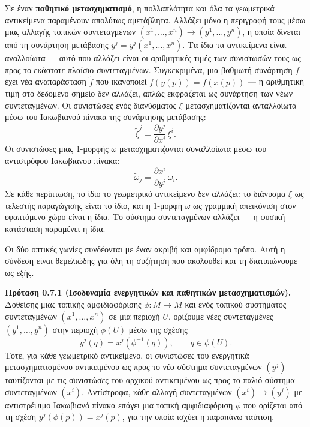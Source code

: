 \documentclass[12pt]{article}
\begin{document}
Σε έναν \textbf{παθητικό μετασχηματισμό}, η πολλαπλότητα και όλα τα γεωμετρικά αντικείμενα παραμένουν απολύτως αμετάβλητα. Αλλάζει μόνο η περιγραφή τους μέσω μιας αλλαγής τοπικών συντεταγμένων $(x^1, \dots, x^n) \to (y^1, \dots, y^n)$, η οποία δίνεται από τη συνάρτηση μετάβασης $y^j = y^j(x^1, \dots, x^n)$. Τα ίδια τα αντικείμενα είναι αναλλοίωτα — αυτό που αλλάζει είναι οι αριθμητικές τιμές των συνιστωσών τους ως προς το εκάστοτε πλαίσιο συντεταγμένων. Συγκεκριμένα, μια βαθμωτή συνάρτηση $f$ έχει νέα αναπαράσταση $\tilde{f}$ που ικανοποιεί $\tilde{f}(y(p)) = f(x(p))$ — η αριθμητική τιμή στο δεδομένο σημείο δεν αλλάζει, απλώς εκφράζεται ως συνάρτηση των νέων συντεταγμένων. Οι συνιστώσες ενός διανύσματος $\xi$ μετασχηματίζονται ανταλλοίωτα μέσω του Ιακωβιανού πίνακα της συνάρτησης μετάβασης:
\[
\tilde{\xi}^j = \frac{\partial y^j}{\partial x^i} \, \xi^i. \tag{0.32}
\]
Οι συνιστώσες μιας 1-μορφής $\omega$ μετασχηματίζονται συναλλοίωτα μέσω του αντιστρόφου Ιακωβιανού πίνακα:
\[
\tilde{\omega}_j = \frac{\partial x^i}{\partial y^j} \, \omega_i. \tag{0.33}
\]
Σε κάθε περίπτωση, το ίδιο το γεωμετρικό αντικείμενο δεν αλλάζει: το διάνυσμα $\xi$ ως τελεστής παραγώγισης είναι το ίδιο, και η 1-μορφή $\omega$ ως γραμμική απεικόνιση στον εφαπτόμενο χώρο είναι η ίδια. Το σύστημα συντεταγμένων αλλάζει — η φυσική κατάσταση παραμένει η ίδια.

Οι δύο οπτικές γωνίες συνδέονται με έναν ακριβή και αμφίδρομο τρόπο. Αυτή η σύνδεση είναι θεμελιώδης για όλη τη συζήτηση που ακολουθεί και τη διατυπώνουμε ως εξής.

\textbf{Πρόταση 0.7.1 (Ισοδυναμία ενεργητικών και παθητικών μετασχηματισμών).}
Δοθείσης μιας τοπικής αμφιδιαφόρισης $\phi: M \to M$ και ενός τοπικού συστήματος συντεταγμένων $(x^1, \dots, x^n)$ σε μια περιοχή $U$, ορίζουμε νέες συντεταγμένες $(y^1, \dots, y^n)$ στην περιοχή $\phi(U)$ μέσω της σχέσης
\[
y^j(q) = x^j(\phi^{-1}(q)), \qquad q \in \phi(U).
\]
Τότε, για κάθε γεωμετρικό αντικείμενο, οι συνιστώσες του ενεργητικά μετασχηματισμένου αντικειμένου ως προς το νέο σύστημα συντεταγμένων $(y^j)$ ταυτίζονται με τις συνιστώσες του αρχικού αντικειμένου ως προς το παλιό σύστημα συντεταγμένων $(x^i)$. Αντίστροφα, κάθε αλλαγή συντεταγμένων $(x^i) \to (y^j)$ με αντιστρέψιμο Ιακωβιανό πίνακα επάγει μια τοπική αμφιδιαφόριση $\phi$ που ορίζεται από τη σχέση $y^j(\phi(p)) = x^j(p)$, για την οποία ισχύει η παραπάνω ταύτιση.
\end{document}
